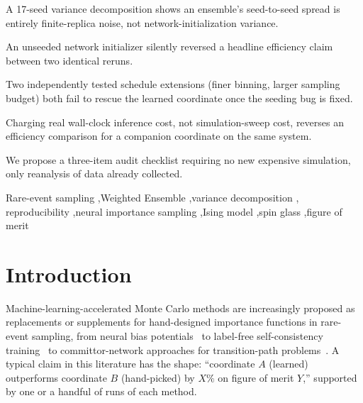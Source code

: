 \documentclass[a4paper,fleqn]{cas-sc}
\begin{document}
\begin{highlights}
\item A 17-seed variance decomposition shows an ensemble's seed-to-seed
spread is entirely finite-replica noise, not network-initialization
variance.
\item An unseeded network initializer silently reversed a headline
efficiency claim between two identical reruns.
\item Two independently tested schedule extensions (finer binning, larger
sampling budget) both fail to rescue the learned coordinate once the
seeding bug is fixed.
\item Charging real wall-clock inference cost, not simulation-sweep cost,
reverses an efficiency comparison for a companion coordinate on the same
system.
\item We propose a three-item audit checklist requiring no new expensive
simulation, only reanalysis of data already collected.
\end{highlights}

\begin{keywords}
Rare-event sampling \sep Weighted Ensemble \sep variance decomposition \sep
reproducibility \sep neural importance sampling \sep Ising model \sep spin
glass \sep figure of merit
\end{keywords}

\maketitle

\section{Introduction}\label{sec:intro}

Machine-learning-accelerated Monte Carlo methods are increasingly proposed as
replacements or supplements for hand-designed importance functions in
rare-event sampling, from neural bias potentials~\citep{hua2024} to
label-free self-consistency training~\citep{kimcai2026} to
committor-network approaches for transition-path
problems~\citep{khoo2019,li2022,kang2024,trizio2025}. A typical claim in this
literature has the shape: ``coordinate $A$ (learned) outperforms coordinate
$B$ (hand-picked) by $X\%$ on figure of merit $Y$,'' supported by one or a
handful of runs of each method.
\end{document}

